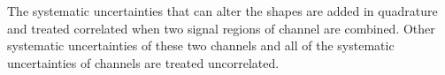 \noindent The systematic uncertainties that can alter the shapes are added in quadrature and 
treated correlated when two signal regions of \tauTau channel are combined. Other systematic uncertainties of these two 
channels and all of the systematic uncertainties of \leptonTau channels are treated uncorrelated.


